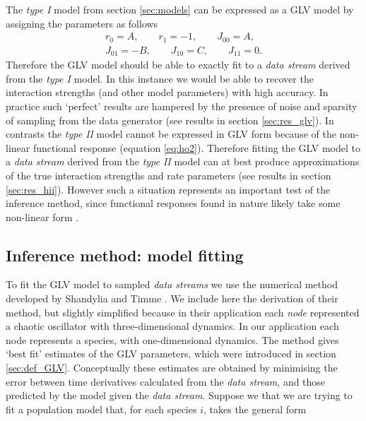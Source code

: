 The \emph{type I} model from section \ref{sec:models} can be expressed as a GLV model by assigning the parameters as follows
\begin{eqnarray}
r_0 = A, \qquad r_1 = -1, \qquad J_{00} = A, \\[10pt]
J_{01} = -B, \qquad J_{10} = C, \qquad J_{11} = 0.
\end{eqnarray}
%
Therefore the GLV model should be able to exactly fit to a \emph{data stream} derived from the \emph{type I} model. In this instance we would be able to recover the interaction strengths (and other model parameters) with high accuracy. In practice such `perfect' results are hampered by the presence of noise and sparsity of sampling from the data generator (see results in section \ref{sec:res_glv}). In contrasts the \emph{type II} model cannot be expressed in GLV form because of the non-linear functional response (equation \eqref{eq:ho2}). Therefore fitting the GLV model to a \emph{data stream} derived from the \emph{type II} model can at best produce approximations of the true interaction strengths and rate parameters (see results in section \ref{sec:res_hii}). However such a situation represents an important test of the inference method, since functional responses found in nature likely take some non-linear form \cite{arditi2012species}.  
 
\subsection{Inference method: model fitting}
\label{sec:timme}


To fit the GLV model to sampled \emph{data streams} we use the numerical method developed by Shandylia and Timme \cite{shandilya2011inferring}. We include here the derivation of their method, but slightly simplified because in their application each \emph{node} represented a chaotic oscillator with three-dimensional dynamics. In our application each node represents a species, with one-dimensional dynamics. The method gives `best fit' estimates of the GLV parameters, which were introduced in section \ref{sec:def_GLV}. Conceptually these estimates are obtained by minimising the error between time derivatives calculated from the \emph{data stream}, and those predicted by the model given the \emph{data stream}. Suppose we that we are trying to fit a population model that, for each species $i$, takes the general form

